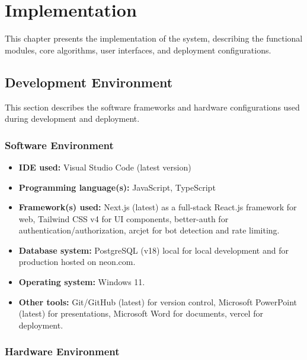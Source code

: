 
\chapter{Implementation}

This chapter presents the implementation of the system, describing the functional modules, core algorithms, user interfaces, and deployment configurations.


\section{Development Environment}

This section describes the software frameworks and hardware configurations used during development and deployment.

\subsection{Software Environment}

\begin{itemize}
\item \textbf{IDE used:} Visual Studio Code (latest version)
\item \textbf{Programming language(s):} JavaScript, TypeScript
\item \textbf{Framework(s) used:} Next.js (latest) as a full-stack React.js framework for web, Tailwind CSS v4 for UI components, better-auth for authentication/authorization, arcjet for bot detection and rate limiting.
\item \textbf{Database system:} PostgreSQL (v18) local for local development and for production hosted on neon.com.
\item \textbf{Operating system:} Windows 11.
\item \textbf{Other tools:} Git/GitHub (latest) for version control, Microsoft PowerPoint (latest) for presentations, Microsoft Word for documents, vercel for deployment.
\end{itemize}

\subsection{Hardware Environment}

